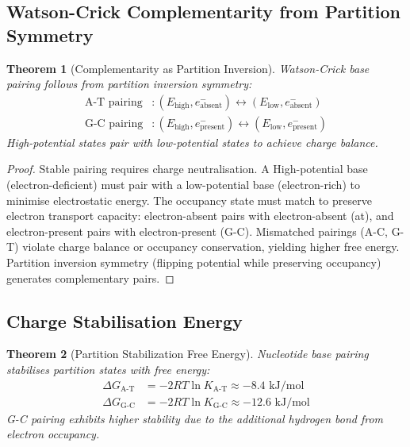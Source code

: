 \documentclass[11pt,a4paper]{article}
\newtheorem{theorem}{Theorem}[section]
\theoremstyle{remark}
\begin{document}
\subsection{Watson-Crick Complementarity from Partition Symmetry}

\begin{theorem}[Complementarity as Partition Inversion]
\label{thm:complementarity}
Watson-Crick base pairing follows from partition inversion symmetry:
\begin{align}
\text{A-T pairing} &: (E_{\text{high}}, e^-_{\text{absent}}) \leftrightarrow (E_{\text{low}}, e^-_{\text{absent}}) \\
\text{G-C pairing} &: (E_{\text{high}}, e^-_{\text{present}}) \leftrightarrow (E_{\text{low}}, e^-_{\text{present}})
\end{align}
High-potential states pair with low-potential states to achieve charge balance.
\end{theorem}

\begin{proof}
Stable pairing requires charge neutralisation. A High-potential base (electron-deficient) must pair with a low-potential base (electron-rich) to minimise electrostatic energy. The occupancy state must match to preserve electron transport capacity: electron-absent pairs with electron-absent (at), and electron-present pairs with electron-present (G-C). Mismatched pairings (A-C, G-T) violate charge balance or occupancy conservation, yielding higher free energy. Partition inversion symmetry (flipping potential while preserving occupancy) generates complementary pairs.
\end{proof}

\subsection{Charge Stabilisation Energy}

\begin{theorem}[Partition Stabilization Free Energy]
\label{thm:stabilization_energy}
Nucleotide base pairing stabilises partition states with free energy:
\begin{align}
\Delta G_{\text{A-T}} &= -2RT \ln K_{\text{A-T}} \approx -8.4 \text{ kJ/mol} \\
\Delta G_{\text{G-C}} &= -2RT \ln K_{\text{G-C}} \approx -12.6 \text{ kJ/mol}
\end{align}
G-C pairing exhibits higher stability due to the additional hydrogen bond from electron occupancy.
\end{theorem}
\end{document}
